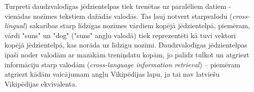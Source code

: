 Turpretī daudzvalodīgas jēdzientelpas tiek trenētas uz paralēliem datiem - vienādas nozīmes tekstiem dažādās valodās. Tas ļauj notvert starpvalodu (\textit{cross-lingual}) sakarības starp līdzīgas nozīmes vārdiem kopējā jēdzientelpā, piemēram, vārdi "suns" un "dog" ("suns" angļu valodā) tiek reprezentēti kā tuvi vektori kopējā jēdzientelpā, kas norāda uz līdzīgu nozīmi. Daudzvalodīgas jēdzientelpas īpaši noder valodām ar mazākām treniņdatu kopām, jo palīdz tulkot un atgriezt informāciju starp valodām (\textit{cross-language information retrieval}) -- piemēram atgriezt kādām vaicājumam angļu Vikipēdijas lapu, ja tai nav latviešu Vikipēdijas ekvivalenta.
